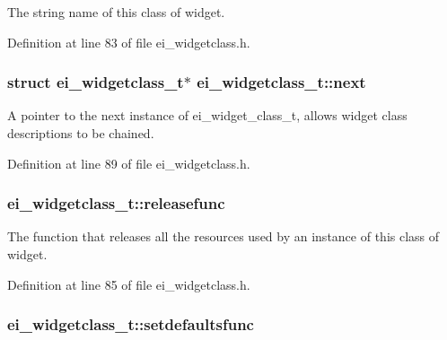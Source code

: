 The string name of this class of widget. 



Definition at line 83 of file ei\+\_\+widgetclass.\+h.

\hypertarget{structei__widgetclass__t_aa184e650475ec2451f033858db1876f0}{
\subsubsection[{next}]{\setlength{\rightskip}{0pt plus 5cm}struct {\bf ei\+\_\+widgetclass\+\_\+t}$\ast$ ei\+\_\+widgetclass\+\_\+t\+::next}}\label{structei__widgetclass__t_aa184e650475ec2451f033858db1876f0}


A pointer to the next instance of ei\+\_\+widget\+\_\+class\+\_\+t, allows widget class descriptions to be chained. 



Definition at line 89 of file ei\+\_\+widgetclass.\+h.

\hypertarget{structei__widgetclass__t_aebe6139b31816495e866c99ec3e83de6}{
\subsubsection[{releasefunc}]{ ei\+\_\+widgetclass\+\_\+t\+::releasefunc}}\label{structei__widgetclass__t_aebe6139b31816495e866c99ec3e83de6}


The function that releases all the resources used by an instance of this class of widget. 



Definition at line 85 of file ei\+\_\+widgetclass.\+h.

\hypertarget{structei__widgetclass__t_a5fec706eefca10172d897cf61b268510}{
\subsubsection[{setdefaultsfunc}]{ ei\+\_\+widgetclass\+\_\+t\+::setdefaultsfunc}}\label{structei__widgetclass__t_a5fec706eefca10172d897cf61b268510}


